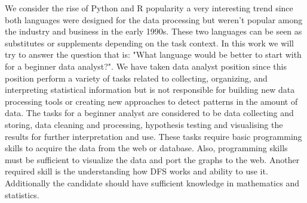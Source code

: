 \documentclass[
  twoside,
  11pt, a4paper,
  footinclude=true,
  headinclude=true,
  cleardoublepage=empty
]{scrreprt}
\begin{document}
        We consider the rise of Python and R popularity a very interesting trend since both languages were designed for the data processing but weren't popular among the industry and business in the early 1990s. These two languages can be seen as substitutes or supplements depending on the task context. In this work we will try to answer the question that is: "What language would be better to start with for a beginner data analyst?". We have taken data analyst position since this position perform a variety of tasks related to collecting, organizing, and interpreting statistical information but is not responsible for building new data processing tools or creating new approaches to detect patterns in the amount of data. The tasks for a beginner analyst are considered to be data collecting and storing, data cleaning and processing, hypothesis testing and visualising the results for further interpretation and use. These tasks require basic programming skills to acquire the data from the web or database. Also, programming skills must be sufficient to visualize the data and port the graphs to the web. Another required skill is the understanding how DFS works and ability to use it. Additionally the candidate should have sufficient knowledge in mathematics and statistics.
        
\end{document}
